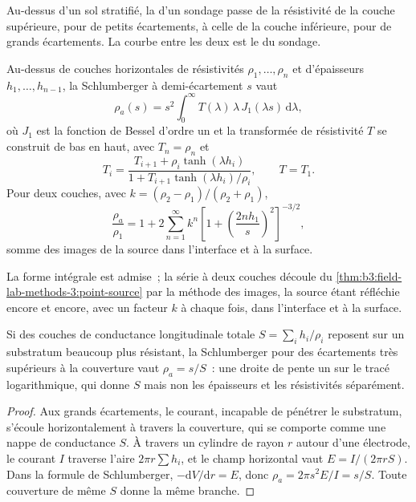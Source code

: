 Au-dessus d'un sol stratifié, la  d'un sondage passe de
la résistivité de la couche supérieure, pour de petits écartements, à celle de
la couche inférieure, pour de grands écartements. La courbe entre les deux est
le  du sondage.

\begin{proposition}\label{prop:b3:field-lab-methods-3:layers}
Au-dessus de couches horizontales de résistivités $\rho_1, \dots, \rho_n$ et
d'épaisseurs $h_1, \dots, h_{n-1}$, la  Schlumberger à
demi-écartement $s$ vaut
\[
\rho_a(s) = s^2\int_0^\infty T(\lambda)\,\lambda\,J_1(\lambda s)\,\mathrm{d}\lambda ,
\]
où $J_1$ est la fonction de Bessel d'ordre un et la transformée de résistivité
$T$ se construit de bas en haut, avec $T_n = \rho_n$ et
\[
T_i = \frac{T_{i+1} + \rho_i\tanh(\lambda h_i)}{1 + T_{i+1}\tanh(\lambda h_i)/\rho_i} ,
\qquad T = T_1 .
\]
Pour deux couches, avec $k = (\rho_2 - \rho_1)/(\rho_2 + \rho_1)$,
\[
\frac{\rho_a}{\rho_1} = 1 + 2\sum_{n=1}^{\infty} k^n
  \left[1 + \left(\frac{2nh_1}{s}\right)^2\right]^{-3/2} ,
\]
somme des images de la source dans l'interface et à la surface.
\end{proposition}
La forme intégrale est admise~; la série à deux couches découle du
\cref{thm:b3:field-lab-methods-3:point-source} par la méthode des images,
la source étant réfléchie encore et encore, avec un facteur $k$ à chaque
fois, dans l'interface et à la surface.

\begin{proposition}\label{prop:b3:field-lab-methods-3:conductance}
Si des couches de conductance longitudinale totale $S = \sum_i h_i/\rho_i$ reposent
sur un substratum beaucoup plus résistant, la  Schlumberger
pour des écartements très supérieurs à la couverture vaut $\rho_a = s/S$~: une
droite de pente un sur le tracé logarithmique, qui donne $S$ mais non les
épaisseurs et les résistivités séparément.
\end{proposition}

\begin{proof}
Aux grands écartements, le courant, incapable de pénétrer le substratum, s'écoule
horizontalement à travers la couverture, qui se comporte comme une nappe de
conductance $S$. À travers un cylindre de rayon $r$ autour d'une électrode, le
courant $I$ traverse l'aire $2\pi r\sum h_i$, et le champ horizontal vaut
$E = I/(2\pi rS)$. Dans la formule de Schlumberger, $-\mathrm{d}V/
\mathrm{d}r = E$, donc $\rho_a = 2\pi s^2 E/I = s/S$. Toute couverture de même
$S$ donne la même branche.
\end{proof}


